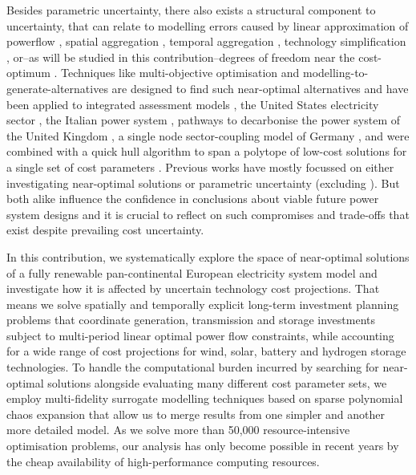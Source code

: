\newpage
Besides parametric uncertainty,
there also exists a structural component to uncertainty, that can
relate to modelling errors caused by
linear approximation of powerflow \cite{flowandlosses},
spatial aggregation \cite{hoersch_spatial_2017},
temporal aggregation \cite{kotzur_tsa_2018},
technology simplification \cite{DeCarolis2017},
or--as will be studied in this contribution--degrees
of freedom near the cost-optimum \cite{nearoptimal}.
Techniques like multi-objective optimisation and modelling-to-generate-alternatives
are designed to find such near-optimal alternatives and have been
applied to integrated assessment models \cite{Price2017}, 
the United States electricity sector \cite{DeCarolis2016},
the Italian power system \cite{lombardi_policy_2020},
pathways to decarbonise the power system of the United Kingdom \cite{Li2017},
a single node sector-coupling model of Germany \cite{nacken_integrated_2019},
and were combined with a quick hull algorithm to span a polytope of low-cost solutions
for a single set of cost parameters \cite{pedersen_modeling_2020}.
Previous works have mostly %
focussed on either investigating near-optimal solutions or parametric uncertainty
(excluding \cite{Li2017,lombardi_policy_2020}).
But both alike influence the confidence in conclusions
about viable future power system designs and it is crucial
to reflect on such compromises and trade-offs that exist despite prevailing cost uncertainty.


In this contribution, we systematically explore the space of near-optimal solutions
of a fully renewable pan-continental European electricity system model
and investigate how it is affected by uncertain technology cost projections.
That means we solve spatially and temporally explicit long-term investment planning problems that
coordinate generation, transmission and storage investments
subject to multi-period linear optimal power flow constraints,
while accounting for a wide range of cost projections for wind, solar, battery and
hydrogen storage technologies.
To handle the computational burden incurred by searching for near-optimal solutions
alongside evaluating many different cost parameter sets,
we employ multi-fidelity surrogate modelling techniques based on sparse polynomial chaos expansion
that allow us to merge results from one simpler and another more detailed model.
As we solve more than 50,000 resource-intensive optimisation problems,
our analysis has only become possible in recent years by the cheap availability 
of high-performance computing resources. 


